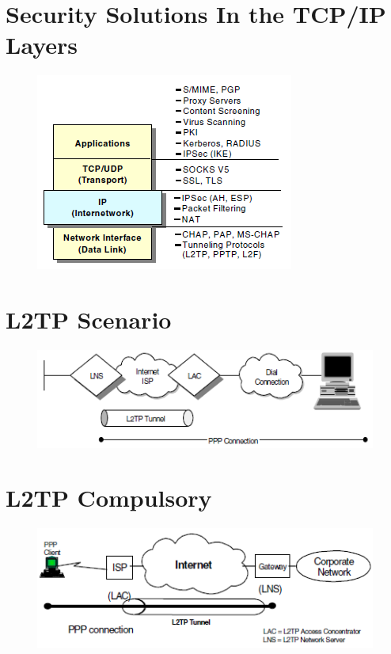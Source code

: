 \documentclass[10pt,a4paper]{article}
\begin{document}
\begin{itemize}
\begin{itemize}
\begin{itemize}
\newpage
\section{Security Solutions In the TCP/IP Layers}

\begin{figure}[hbtp]
\includegraphics[scale=1]{Security Solutions In the TCP IP Layers.png}
\end{figure}

\newpage
\section{L2TP Scenario}

\begin{figure}[hbtp]
\centering
\includegraphics[scale=1]{L2TP_Scenario.png}
\end{figure}

\newpage
\section{L2TP Compulsory}

\begin{figure}[hbtp]
\centering
\includegraphics[scale=1]{L2TPCompulsory.png}
\end{figure}


\end{itemize}
\end{itemize}
\end{itemize}
\end{document}
